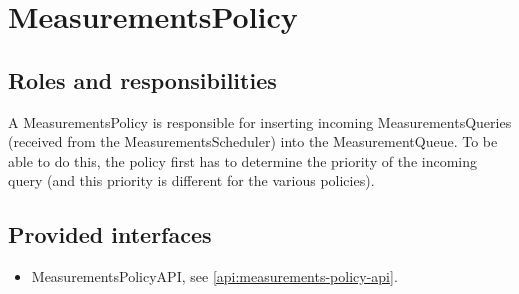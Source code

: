 \section{MeasurementsPolicy}
\label{element:measurements-policy}

\subsection{Roles and responsibilities}

\npar A MeasurementsPolicy is responsible for inserting incoming
MeasurementsQueries (received from the MeasurementsScheduler) into the
MeasurementQueue. To be able to do this, the policy first has to determine the
priority of the incoming query (and this priority is different for the various
policies).

\subsection{Provided interfaces}

\begin{itemize}
  \item MeasurementsPolicyAPI, see \ref{api:measurements-policy-api}.
\end{itemize}